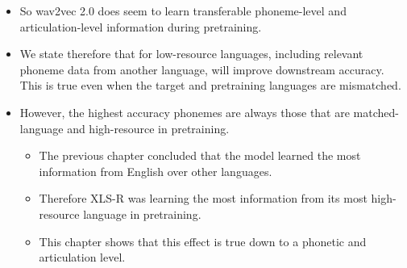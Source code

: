 \begin{itemize}
    \
    \begin{itemize}
        \item Good candiates would be:
        \item //, // and //: These are outlier fricatives and a stops that are low-resource but high-accuracy.
        \item English /\textipa{R}/. The English tap gets accuracy up to 55\%, but the highest accuracy is on a mixed model
        \item high-resource Spanish vowels vs low-resource English vowels.
    \end{itemize}
    \fi
    \item So wav2vec 2.0 does seem to learn transferable phoneme-level and articulation-level information during pretraining. 
    \item We state therefore that for low-resource languages, including relevant phoneme data from another language, will improve downstream accuracy. This is true even when the target and pretraining languages are mismatched.
    \item However, the highest accuracy phonemes are always those that are matched-language and high-resource in pretraining.
    
    \begin{itemize}
        \item The previous chapter concluded that the model learned the most information from English over other languages.
        \item Therefore XLS-R was learning the most information from its most high-resource language in pretraining.
        \item This chapter shows that this effect is true down to a phonetic and articulation level.
    \end{itemize}
    
\end{itemize}

